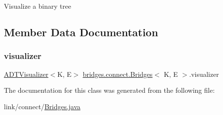 Visualize a binary tree 

\subsection{Member Data Documentation}
\hypertarget{classbridges_1_1connect_1_1_bridges_af3fc35779b31c976ed8bf2e173310502}{}\label{classbridges_1_1connect_1_1_bridges_af3fc35779b31c976ed8bf2e173310502} 
\subsubsection{\texorpdfstring{visualizer}{visualizer}}
{\footnotesize\ttfamily \hyperlink{classbridges_1_1base_1_1_a_d_t_visualizer}{A\+D\+T\+Visualizer}$<$K, E$>$ \hyperlink{classbridges_1_1connect_1_1_bridges}{bridges.\+connect.\+Bridges}$<$ K, E $>$.visualizer\hspace{0.3cm}{\ttfamily [protected]}}



The documentation for this class was generated from the following file\+:\begin{DoxyCompactItemize}
\item 
link/connect/\hyperlink{_bridges_8java}{Bridges.\+java}\end{DoxyCompactItemize}
